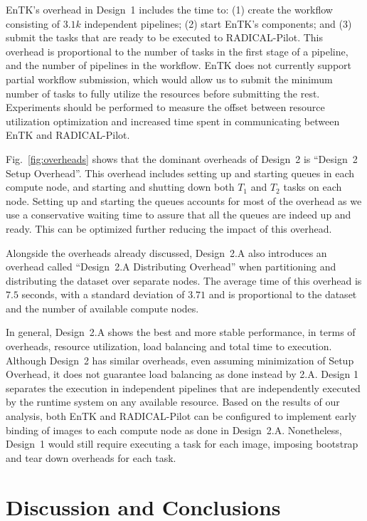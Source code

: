 EnTK's overhead in Design~1 includes the time to: (1) create the workflow consisting of $3.1k$ independent pipelines; (2) start EnTK's components; and (3) submit the tasks that are ready to be executed to RADICAL-Pilot. 
This overhead is proportional to the number of tasks in the first stage of a pipeline, and the number of pipelines in the workflow.
EnTK does not currently support partial workflow submission, which would allow us to submit the minimum number of tasks to fully utilize the resources before submitting the rest.
Experiments should be performed to measure the offset between resource utilization optimization and increased time spent in communicating between EnTK and RADICAL-Pilot.

Fig.~\ref{fig:overheads} shows that the dominant overheads of Design~2 is ``Design~2 Setup Overhead''.
This overhead includes setting up and starting queues in each compute node, and starting and shutting down both $T_{1}$ and $T_{2}$ tasks on each node.
Setting up and starting the queues accounts for most of the overhead as we use a conservative waiting time to assure that all the queues are indeed up and ready.
This can be optimized further reducing the impact of this overhead.

Alongside the overheads already discussed, Design~2.A also introduces an overhead called ``Design~2.A Distributing Overhead'' when partitioning and distributing the dataset over separate nodes.
The average time of this overhead is $7.5$ seconds, with a standard deviation of $3.71$ and is proportional to the dataset and the number of available compute nodes.

In general, Design~2.A shows the best and more stable performance, in terms of overheads, resource utilization, load balancing and total time to execution.
Although Design~2 has similar overheads, even assuming minimization of Setup Overhead, it does not guarantee load balancing as done instead by 2.A.
Design 1 separates the execution in independent pipelines that are independently executed by the runtime system on any available resource.
Based on the results of our analysis, both EnTK and RADICAL-Pilot can be configured to implement early binding of images to each compute node as done in Design~2.A.
Nonetheless, Design~1 would still require executing a task for each image, imposing bootstrap and tear down overheads for each task.

\section{Discussion and Conclusions}
\label{sec:des_concl}

